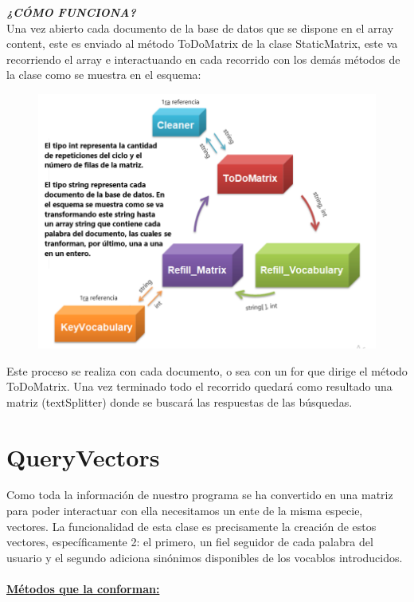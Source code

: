 \documentclass[12pt, letterpaper]{article}
\begin{document}
\textbf{\textit{¿CÓMO FUNCIONA? }} \\
 Una vez abierto cada documento de la base de datos que se dispone en el array content, este es enviado al método ToDoMatrix de la clase StaticMatrix, este va recorriendo el array e interactuando en cada recorrido con los demás métodos de la clase como se muestra en el esquema: 

\begin{figure}[h]
    \includegraphics[scale= 0.53]{uno.png}
\end{figure}

Este proceso se realiza con cada documento, o sea con un for que dirige el método ToDoMatrix. Una vez terminado todo el recorrido quedará como resultado una matriz (textSplitter) donde se buscará las respuestas de las búsquedas. 

\section{QueryVectors}
Como toda la información de nuestro programa se ha convertido en una matriz para poder interactuar con ella necesitamos un ente de la misma especie, vectores. 
La funcionalidad de esta clase es precisamente la creación de estos vectores, específicamente 2: el primero, un fiel seguidor de cada palabra del usuario y el segundo adiciona sinónimos disponibles de los vocablos introducidos. \\ \\

\textbf{\underline{Métodos que la conforman: }} 
\end{document}
